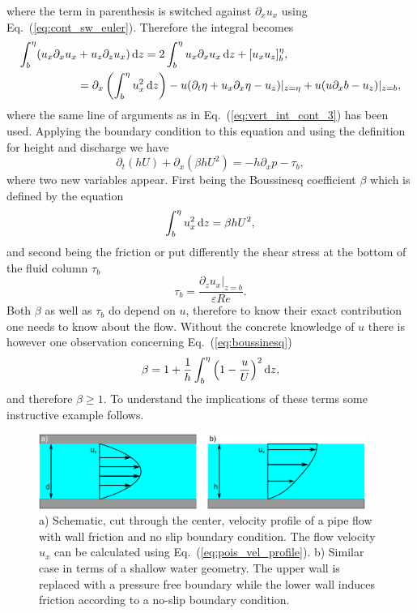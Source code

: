 where the term in parenthesis is switched against $\partial_x u_x$ using Eq.~(\ref{eq:cont_sw_euler}). 
Therefore the integral becomes
\begin{align}
    \int_b^{\eta}(u_x\partial_x u_x &+ u_z\partial_{z} u_x )\mathop{}\!\mathrm{d} z = 2\int_b^{\eta} u_x\partial_x u_x \mathop{}\!\mathrm{d} z + [u_x u_z]_b^{\eta},\nonumber \\
     &= \partial_x\left(\int_b^{\eta}u_x^2 \mathop{}\!\mathrm{d} z\right) - u(\partial_t\eta + u_x\partial_x\eta - u_z)|_{z=\eta} + u(u\partial_x b - u_z)|_{z=b},
\end{align}
where the same line of arguments as in Eq.~(\ref{eq:vert_int_cont_3}) has been used.
Applying the boundary condition to this equation and using the definition for height and discharge we have
\begin{equation}\label{eq:sw_mom_final}
    \partial_t(hU) + \partial_x(\beta hU^2) = -h\partial_x p - \tau_b,
\end{equation}
where two new variables appear.
First being the Boussinesq coefficient $\beta$ which is defined by the equation
\begin{equation}\label{eq:boussinesq}
    \int_b^{\eta} u_x^2 \mathop{}\!\mathrm{d} z = \beta h U^2,
\end{equation}
and second being the friction or put differently the shear stress at the bottom of the fluid column $\tau_b$
\begin{equation}\label{eq:sw_bot_friction}
    \tau_b = \frac{\partial_z u_x|_{z=b}}{\varepsilon Re}. 
\end{equation}
Both $\beta$ as well as $\tau_b$ do depend on $u$, therefore to know their exact contribution one needs to know about the flow.
Without the concrete knowledge of $u$ there is however one observation concerning Eq.~(\ref{eq:boussinesq})
\begin{equation}\label{eq:beta_lims}
    \beta = 1 + \frac{1}{h}\int_b^{\eta}\left(1 - \frac{u}{U}\right)^2 \mathop{}\!\mathrm{d} z,
\end{equation}
and therefore $\beta \geq 1$.
To understand the implications of these terms some instructive example follows.

\begin{figure}
    \centering
    \includegraphics[width=0.95\textwidth]{graphics/Simple_flow.pdf}
    \caption{a) Schematic, cut through the center, velocity profile of a pipe flow with wall friction and no slip boundary condition.
    The flow velocity $u_x$ can be calculated using Eq.~(\ref{eq:pois_vel_profile}).
    b) Similar case in terms of a shallow water geometry. 
    The upper wall is replaced with a pressure free boundary while the lower wall induces friction according to a no-slip boundary condition.
    }
    \label{fig:pois_vel_profile}
\end{figure}
